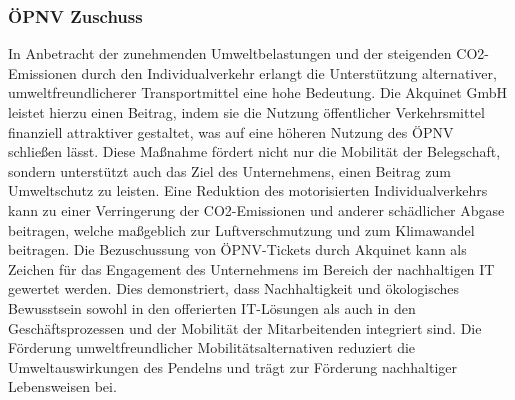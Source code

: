 \subsubsection{ÖPNV Zuschuss}\label{sec:oepnvzuschuss}
In Anbetracht der zunehmenden Umweltbelastungen und der steigenden CO2-Emissionen durch den Individualverkehr erlangt die Unterstützung alternativer, umweltfreundlicherer Transportmittel eine hohe Bedeutung.\cite{personalverkehr} \newline
Die Akquinet GmbH leistet hierzu einen Beitrag, indem sie die Nutzung öffentlicher Verkehrsmittel finanziell attraktiver gestaltet, was auf eine höheren Nutzung des ÖPNV schließen lässt. Diese Maßnahme fördert nicht nur die Mobilität der Belegschaft, sondern unterstützt auch das Ziel des Unternehmens, einen Beitrag zum Umweltschutz zu leisten. Eine Reduktion des motorisierten Individualverkehrs kann zu einer Verringerung der CO2-Emissionen und anderer schädlicher Abgase beitragen, welche maßgeblich zur Luftverschmutzung und zum Klimawandel beitragen.\newline
Die Bezuschussung von ÖPNV-Tickets durch Akquinet kann als Zeichen für das Engagement des Unternehmens im Bereich der nachhaltigen IT gewertet werden. Dies demonstriert, dass Nachhaltigkeit und ökologisches Bewusstsein sowohl in den offerierten IT-Lösungen als auch in den Geschäftsprozessen und der Mobilität der Mitarbeitenden integriert sind. Die Förderung umweltfreundlicher Mobilitätsalternativen reduziert die Umweltauswirkungen des Pendelns und trägt zur Förderung nachhaltiger Lebensweisen bei.


